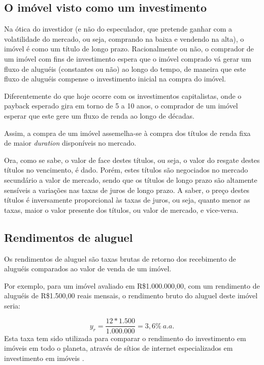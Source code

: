 \documentclass[
	12pt,				%
	oneside,			%
	a4paper,			%
	chapter=TITLE,		%
	section=TITLE,		%
	english,			%
	brazil				%
	]{abntex2}
\begin{document}
\subsection{O imóvel visto como um
investimento}\label{o-imuxf3vel-visto-como-um-investimento}

Na ótica do investidor (e não do especulador, que pretende ganhar com a
volatilidade do mercado, ou seja, comprando na baixa e vendendo na
alta), o imóvel é como um título de longo prazo. Racionalmente ou não, o
comprador de um imóvel com fins de investimento espera que o imóvel
comprado vá gerar um fluxo de aluguéis (constantes ou não) ao longo do
tempo, de maneira que este fluxo de aluguéis compense o investimento
inicial na compra do imóvel.

Diferentemente do que hoje ocorre com os investimentos capitalistas,
onde o payback esperado gira em torno de 5 a 10 anos, o comprador de um
imóvel esperar que este gere um fluxo de renda ao longo de décadas.

Assim, a compra de um imóvel assemelha-se à compra dos títulos de renda
fixa de maior \emph{duration} disponíveis no mercado.

Ora, como se sabe, o valor de face destes títulos, ou seja, o valor do
resgate destes títulos no vencimento, é dado. Porém, estes títulos são
negociados no mercado secundário a valor de mercado, sendo que os
títulos de longo prazo são altamente sensíveis a variações nas taxas de
juros de longo prazo. A saber, o preço destes títulos é inversamente
proporcional às taxas de juros, ou seja, quanto menor as taxas, maior o
valor presente dos títulos, ou valor de mercado, e vice-versa.

\subsection{Rendimentos de aluguel}\label{rendimentos-de-aluguel}

Os rendimentos de aluguel são taxas brutas de retorno dos recebimento de
aluguéis comparados ao valor de venda de um imóvel.

Por exemplo, para um imóvel avaliado em R\$1.000.000,00, com um
rendimento de aluguéis de R\$1.500,00 reais mensais, o rendimento bruto
do aluguel deste imóvel seria:

\[y_r = \frac{12*1.500}{1.000.000} = 3,6\% \ a.a.\] Esta taxa tem sido
utilizada para comparar o rendimento do investimento em imóveis em todo
o planeta, através de sítios de internet especializados em investimento
em imóveis \autocite{gpg}.
\end{document}
